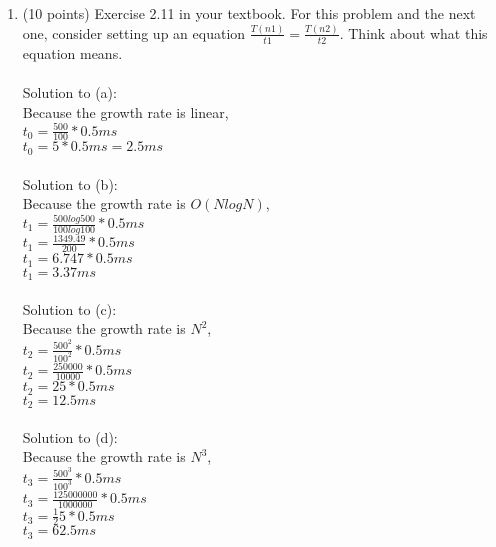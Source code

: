 \documentclass[12pt]{article}
\begin{document}
\begin{enumerate}
\item (10 points) Exercise 2.11 in your textbook. For this problem and the next one, 
consider setting up an equation $ \frac{T(n1)}{t1} = \frac{T(n2)}{t2} $. Think about what this 
equation means. 
\\\\Solution to (a):
\\Because the growth rate is linear,
\\$t_0 = \frac{500}{100} * 0.5ms $
\\$t_0 = 5 * 0.5ms = 2.5ms $
\\\\Solution to (b):
\\Because the growth rate is $O(NlogN)$,
\\$t_1 = \frac{500log500}{100log100}*0.5ms$
\\$t_1 = \frac{1349.49}{200}*0.5ms$
\\$t_1 = 6.747 * 0.5ms$
\\$t_1 = 3.37ms$
\\\\Solution to (c):
\\Because the growth rate is $N^2$,
\\$t_2 = \frac{500^2}{100^2}*0.5ms$
\\$t_2 = \frac{250000}{10000}*0.5ms$
\\$t_2 = 25*0.5ms$
\\$t_2 = 12.5ms$
\\\\Solution to (d):
\\Because the growth rate is $N^3$,
\\$t_3 = \frac{500^3}{100^3}*0.5ms$
\\$t_3 = \frac{125000000}{1000000}*0.5ms$
\\$t_3 = \frac125*0.5ms$
\\$t_3 =62.5ms$
\\\\


\end{enumerate}
\end{document}
